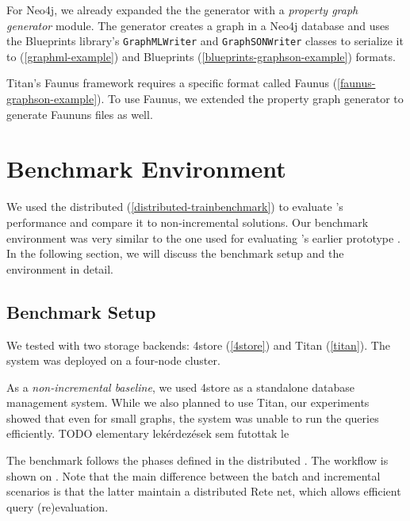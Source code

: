 For Neo4j, we already expanded the the generator with a \emph{property graph generator} module. The generator creates a graph in a Neo4j database and uses the Blueprints library's \texttt{GraphMLWriter} and \texttt{GraphSONWriter} classes to serialize it to \graphml{} (\autoref{graphml-example}) and Blueprints \graphson{} (\autoref{blueprints-graphson-example}) formats. 

Titan's Faunus framework requires a specific format called Faunus \graphson{} (\autoref{faunus-graphson-example}). To use Faunus, we extended the property graph generator to generate Faununs \graphson{} files as well.


\section{Benchmark Environment}
\label{sec:benchmark-environment}

We used the distributed \tb{} (\autoref{distributed-trainbenchmark}) to evaluate \iqd{}'s performance and compare it to non-incremental solutions. Our benchmark environment was very similar to the one used for evaluating \iqd{}'s earlier prototype \cite{Izso:2013:IIG:2487766.2487772}. In the following section, we will discuss the benchmark setup and the environment in detail.

\subsection{Benchmark Setup}

We tested \iqd{} with two storage backends: 4store (\autoref{4store}) and Titan (\autoref{titan}). The system was deployed on a four-node cluster.

As a \emph{non-incremental baseline}, we used 4store as a standalone database management system. While we also planned to use Titan, %
our experiments showed that even for small graphs, the system was unable to run the queries efficiently. TODO elementary lekérdezések sem futottak le


The benchmark follows the phases defined in the distributed \tb{}. The workflow is shown on . Note that the main difference between the batch and incremental scenarios is that the latter maintain a distributed Rete net, which allows efficient query (re)evaluation.   

